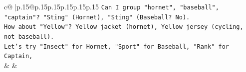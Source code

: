 \documentclass{article}
\begin{document}
{\begin{supertabular}{c@{$\;$}|p{.15\linewidth}@{}p{.15\linewidth}p{.15\linewidth}p{.15\linewidth}p{.15\linewidth}p{.15\linewidth}}
{{{\texttt{Can I group "hornet", "baseball", "captain"? "Sting" (Hornet), "Sting" (Baseball? No).} \\
\texttt{How about "Yellow"? Yellow jacket (hornet), Yellow jersey (cycling, not baseball).} \\
\texttt{Let's try "Insect" for Hornet, "Sport" for Baseball, "Rank" for Captain,} \\
            }
        }
    }
    & & \\ \\

\end{supertabular}
}
\end{document}
